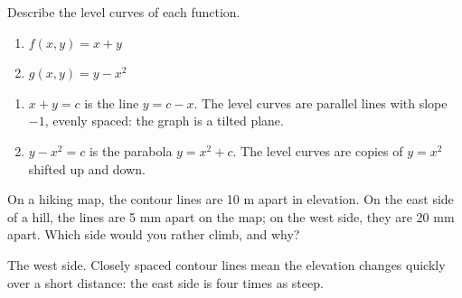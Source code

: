 \begin{Exercise}[title={Level Curves}, label=mvf_level]
Describe the level curves of each function.
\begin{enumerate}
\item $f(x, y) = x + y$
\item $g(x, y) = y - x^2$
\end{enumerate}
\end{Exercise}
\begin{Answer}[ref=mvf_level]
\begin{enumerate}
\item $x + y = c$ is the line $y = c - x$. The level curves are parallel
lines with slope $-1$, evenly spaced: the graph is a tilted plane.
\item $y - x^2 = c$ is the parabola $y = x^2 + c$. The level curves are
copies of $y = x^2$ shifted up and down.
\end{enumerate}
\end{Answer}

\begin{Exercise}[title={Reading a Topographic Map}, label=mvf_topo]
On a hiking map, the contour lines are 10 m apart in elevation. On the
east side of a hill, the lines are 5 mm apart on the map; on the west
side, they are 20 mm apart. Which side would you rather climb, and why?
\end{Exercise}
\begin{Answer}[ref=mvf_topo]
The west side. Closely spaced contour lines mean the elevation changes
quickly over a short distance: the east side is four times as steep.
\end{Answer}
